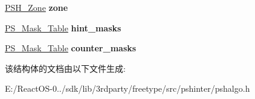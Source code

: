 \begin{DoxyCompactItemize}
\hyperlink{struct_p_s_h___zone_rec__}{P\+S\+H\+\_\+\+Zone} {\bfseries zone}
\item 
\mbox{\label{struct_p_s_h___hint___table_rec___a4131293707d0986ab63bc96ca580356c}} 
\hyperlink{struct_p_s___mask___table_rec__}{P\+S\+\_\+\+Mask\+\_\+\+Table} {\bfseries hint\+\_\+masks}
\item 
\mbox{\label{struct_p_s_h___hint___table_rec___ac0632dc8f0e42a791c13f7c184b87ffe}} 
\hyperlink{struct_p_s___mask___table_rec__}{P\+S\+\_\+\+Mask\+\_\+\+Table} {\bfseries counter\+\_\+masks}
\end{DoxyCompactItemize}


该结构体的文档由以下文件生成\+:\begin{DoxyCompactItemize}
\item 
E\+:/\+React\+O\+S-\/0../sdk/lib/3rdparty/freetype/src/pshinter/pshalgo.\+h\end{DoxyCompactItemize}
